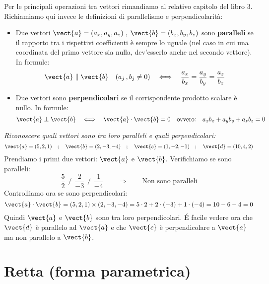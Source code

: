 Per le principali operazioni tra vettori rimandiamo al relativo capitolo del libro 3. Richiamiamo qui invece le definizioni di parallelismo e perpendicolarità:
\begin{itemize}
 \item Due vettori $ \vect{a} = (a_x,a_y,a_z) \;,\; \vect{b} = (b_x,b_y,b_z)$ sono \textbf{paralleli} se il rapporto tra i rispettivi coefficienti è sempre lo uguale (nel caso in cui una coordinata del primo vettore sia nulla, dev'esserlo anche nel secondo vettore). In formule:
\[\vect{a} \parallel \vect{b} \quad (a_j\,, b_j \neq 0) \quad \Longleftrightarrow \quad \frac{a_x}{b_x} = \frac{a_y}{b_y} = \frac{a_z}{b_z}\]
\item Due vettori sono \textbf{perpendicolari} se il corrispondente prodotto scalare è nullo. In formule:
\[ \vect{a} \perp \vect{b} \quad \Longleftrightarrow\quad \vect{a} \cdot \vect{b} = 0 \quad \text{ovvero:} \quad a_xb_x+a_yb_y+a_zb_z=0\]
\end{itemize}
\begin{esempio}
 \emph{Riconoscere quali vettori sono tra loro paralleli e quali perpendicolari:}
 \[\vect{a} = (5,2,1) \quad;\quad \vect{b} = (2,-3,-4) \quad;\quad \vect{c} = (1,-2,-1)  \quad;\quad \vect{d} = (10,4,2)\]
 Prendiamo i primi due vettori: $\vect{a}$ e $\vect{b}$. Verifichiamo se sono paralleli:
 \[\frac{5}{2} \neq \frac{2}{-3} \neq \frac{1}{-4} \qquad \Rightarrow \qquad \text{Non sono paralleli}\]
 Controlliamo ora se sono perpendicolari:
 \[\vect{a} \cdot \vect{b} = (5,2,1)\times (2,-3,-4) = 5\cdot 2+2\cdot (-3)+1 \cdot (-4) = 10-6-4=0\]
 Quindi $\vect{a}$ e $\vect{b}$ sono tra loro perpendicolari. \'E facile vedere ora che $\vect{d}$ è parallelo ad $\vect{a}$ e che $\vect{c}$ è perpendicolare a $\vect{a}$ ma non parallelo a $\vect{b}$.
\end{esempio}


\section{Retta (forma parametrica)}

